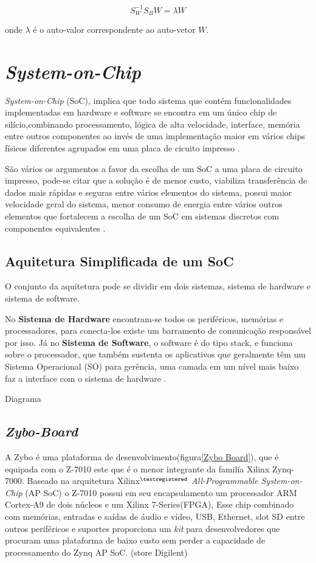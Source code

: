 \begin{equation}
	\label{eq: final}
	S_W^{-1} S_B W = \lambda W
\end{equation}
 
onde $\lambda$ é o auto-valor correspondente ao auto-vetor $W$.
\section{\textit{System-on-Chip}}

\textit{System-on-Chip} (SoC), implica que todo sistema que contém funcionalidades implementadas em hardware e software se encontra em um único chip de silício,combinando processamento, lógica de alta velocidade, interface, memória entre outros componentes ao invés de uma implementação maior em vários chips físicos diferentes agrupados em uma placa 
de cicuito impresso \cite{zynqBook}.

São vários os argumentos a favor da escolha de um SoC a uma placa de circuito impresso, pode-se citar que a solução é de menor custo, viabiliza transferência de dados mais rápidas e seguras entre vários elementos do sistema, possui maior velocidade geral do sistema, menor consumo de energia entre vários outros elementos que fortalecem a escolha de um SoC em sistemas discretos com componentes equivalentes \cite{zynqBook}.

\subsection{Aquitetura Simplificada de um SoC}

O conjunto da aquitetura pode se dividir em dois sistemas, sistema de
hardware  e sistema de software. 


No \textbf{Sistema de Hardware}
encontram-se todos os periféricos,
memórias e processadores, para conecta-los
existe um barramento de comunicação
responsável por isso.
Já no \textbf{Sistema de Software}, o software é do tipo stack, e funciona sobre o
processador, que também sustenta os aplicativos que geralmente têm um
Sistema Operacional (SO) para gerência, uma camada em um nível mais baixo
faz a interface com o sistema de hardware \cite{zynqBook}.

 Diagrama
\subsection{\textit{Zybo-Board}}
A Zybo é uma plataforma de desenvolvimento(figura\ref{Zybo Board}), que é equipada com o Z-7010
este que é  o menor integrante da familía Xilinx Zynq-7000.
Baseado na arquitetura Xilinx$^{\textregistered}$ \textit{All-Programmable System-on-Chip} (AP SoC)
o Z-7010 possui em seu encapsulamento um processador ARM Cortex-A9 de 
dois núcleos e um Xilinx 7-Series(FPGA), Esse chip combinado com memórias, entradas 
e saídas de áudio e vídeo, USB, Ethernet, slot SD entre outros periféricos e suportes
proporciona um \textit{kit} para desenvolvedores que procuram uma plataforma de baixo custo
sem perder a capacidade de processamento do Zynq AP SoC. (store Digilent)  

